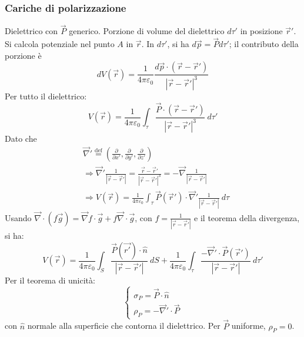 \documentclass[a4paper]{scrartcl}
\numberwithin{equation}{subsection}
\theoremstyle{style1}
\begin{document}
\subsubsection{Cariche di polarizzazione}
Dielettrico con $\vec{P}$ generico. Porzione di volume del dielettrico $d\tau '$ in posizione $\vec{r}'$. Si calcola potenziale nel punto $A$ in $\vec{r}$. In $d\tau '$, si ha $d\vec{p} = \vec{P}d\tau '$; il contributo della porzione \`e
\begin{equation}
	dV(\vec{r}) = \frac{1}{4\pi \varepsilon _0} \frac{d\vec{p}\cdot (\vec{r}-\vec{r}')}{\left\lvert \vec{r}-\vec{r}' \right\rvert^3}
\end{equation}
Per tutto il dielettrico:
\begin{equation}
	V(\vec{r}) = \frac{1}{4\pi \varepsilon _0} \int_{\tau }  \frac{\vec{P}\cdot (\vec{r}-\vec{r}')}{\left\lvert \vec{r}-\vec{r}' \right\rvert ^3}\ d\tau '
\end{equation}
Dato che
\begin{equation}
	\begin{split}
		&\vec{\nabla }' \overset{\text{def}}{=} \left(\frac{\partial }{\partial x'} , \frac{\partial }{\partial y'}, \frac{\partial }{\partial z'} \right) \\
		&\Rightarrow \vec{\nabla }' \frac{1}{\left\lvert \vec{r}-\vec{r}' \right\rvert } = \frac{\vec{r}-\vec{r}'}{\left\lvert \vec{r}-\vec{r}' \right\rvert ^3} = - \vec{\nabla } \frac{1}{\left\lvert \vec{r}-\vec{r}' \right\rvert}\\
		&\Rightarrow V(\vec{r}) = \frac{1}{4\pi \varepsilon _0}\int_{\tau } \vec{P}(\vec{r}') \cdot \vec{\nabla }' \frac{1}{\left\lvert \vec{r}- \vec{r}'\right\rvert}\ d\tau 
	\end{split}
\end{equation}
Usando $\vec{\nabla }\cdot (f\vec{g}) = \vec{\nabla }f \cdot \vec{g} + f\vec{\nabla }\cdot \vec{g}$, con $f = \frac{1}{\left\lvert \vec{r}- \vec{r}'\right\rvert }$ e il teorema della divergenza, si ha:
\begin{equation}
	V(\vec{r}) = \frac{1}{4 \pi \varepsilon _0}\int_{S} \frac{\vec{P}(\vec{r'})\cdot \hat{n}}{\left\lvert \vec{r}-\vec{r}' \right\rvert } \ dS + \frac{1}{4\pi \varepsilon _0} \int_{\tau } \frac{- \vec{\nabla }'\cdot \vec{P}(\vec{r}')}{\left\lvert \vec{r}-\vec{r}' \right\rvert }\ d\tau '
\end{equation}
Per il teorema di unicit\`a:
\begin{equation}
	\begin{cases}
		\sigma _P = \vec{P}\cdot \hat{n}\\
		\rho _P = - \vec{\nabla }'\cdot \vec{P}
	\end{cases}
\end{equation}
con $\hat{n}$ normale alla superficie che contorna il dielettrico. Per $\vec{P}$ uniforme, $\rho _P = 0$.
\end{document}
